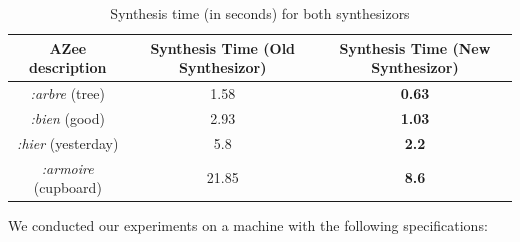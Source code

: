 \documentclass[../../main.tex]{subfiles}
\begin{document}
{\begin{table}
    \centering
    \begin{tabular}{|c|c|c|}
        \hline
        \textbf{AZee description} & \textbf{Synthesis Time (Old Synthesizor)} & \textbf{Synthesis Time (New Synthesizor)}\\
        \hline
        \emph{:arbre} (tree) & 1.58 & \textbf{0.63} \\
        \emph{:bien} (good) & 2.93 & \textbf{1.03} \\
        \emph{:hier} (yesterday) & 5.8 & \textbf{2.2} \\
        \emph{:armoire} (cupboard) & 21.85 & \textbf{8.6} \\
        \hline
    \end{tabular}
    \caption{Synthesis time (in seconds) for both synthesizors}
    \label{tab:faster_executions}
\end{table}

We conducted our experiments on a machine with the following specifications:
}
\end{document}
